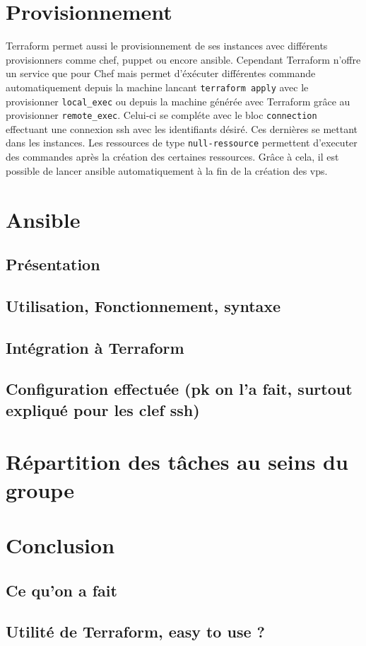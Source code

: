 \documentclass[]{article}
\begin{document}
\section{Provisionnement}\label{provisionnement}

Terraform permet aussi le provisionnement de ses instances avec
différents provisionners comme chef, puppet ou encore ansible. Cependant
Terraform n'offre un service que pour Chef mais permet d'éxécuter
différentes commande automatiquement depuis la machine lancant
\texttt{terraform\ apply} avec le provisionner \texttt{local\_exec} ou
depuis la machine générée avec Terraform grâce au provisionner
\texttt{remote\_exec}. Celui-ci se compléte avec le bloc
\texttt{connection} effectuant une connexion ssh avec les identifiants
désiré. Ces dernières se mettant dans les instances. Les ressources de
type \texttt{null-ressource} permettent d'executer des commandes après
la création des certaines ressources. Grâce à cela, il est possible de
lancer ansible automatiquement à la fin de la création des vps.

\section{Ansible}\label{ansible}

\subsection{Présentation}\label{pruxe9sentation}

\subsection{Utilisation, Fonctionnement,
syntaxe}\label{utilisation-fonctionnement-syntaxe}

\subsection{Intégration à
Terraform}\label{intuxe9gration-uxe0-terraform}

\subsection{Configuration effectuée (pk on l'a fait, surtout expliqué
pour les clef
ssh)}\label{configuration-effectuuxe9e-pk-on-la-fait-surtout-expliquuxe9-pour-les-clef-ssh}

\section{Répartition des tâches au seins du
groupe}\label{ruxe9partition-des-tuxe2ches-au-seins-du-groupe}

\section{Conclusion}\label{conclusion}

\subsection{Ce qu'on a fait}\label{ce-quon-a-fait}

\subsection{Utilité de Terraform, easy to use
?}\label{utilituxe9-de-terraform-easy-to-use}
\end{document}
